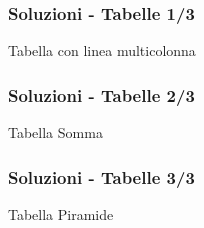 \begin{frame}[fragile]

  \frametitle{Soluzioni - Tabelle 1/3}

  \begin{exampleblock}{Tabella con linea multicolonna}
    
  \end{exampleblock}

\end{frame}

\begin{frame}[fragile]

  \frametitle{Soluzioni - Tabelle 2/3}

  \begin{exampleblock}{Tabella Somma}
    
  \end{exampleblock}

\end{frame}

\begin{frame}[fragile]

  \frametitle{Soluzioni - Tabelle 3/3}

  \begin{exampleblock}{Tabella Piramide}
    
  \end{exampleblock}

\end{frame}
